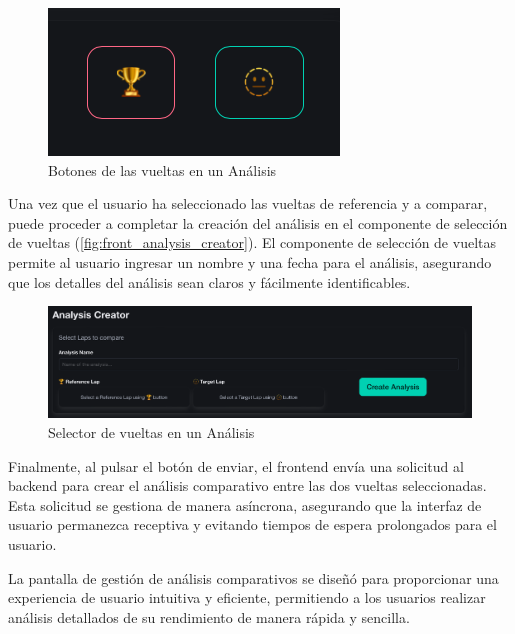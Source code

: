 \begin{figure}[H]
\centering
\includegraphics[width=0.3\linewidth]{./figs/herramientas/desarrollo/front_analysis_btn.png}
\caption[Botones de las vueltas en un Análisis]{Botones de las vueltas en un Análisis}
\label{fig:front_analysis_btn}
\end{figure}

Una vez que el usuario ha seleccionado las vueltas de referencia y a comparar, puede proceder a completar la creación del análisis en el componente de selección de vueltas (\autoref{fig:front_analysis_creator}). El componente de selección de vueltas permite al usuario ingresar un nombre y una fecha para el análisis, asegurando que los detalles del análisis sean claros y fácilmente identificables.

\begin{figure}[H]
\centering
\includegraphics[width=0.6\linewidth]{./figs/herramientas/desarrollo/front_analysis_creator.png}
\caption[Selector de vueltas en un Análisis]{Selector de vueltas en un Análisis}
\label{fig:front_analysis_creator}
\end{figure}

Finalmente, al pulsar el botón de enviar, el frontend envía una solicitud al backend para crear el análisis comparativo entre las dos vueltas seleccionadas. Esta solicitud se gestiona de manera asíncrona, asegurando que la interfaz de usuario permanezca receptiva y evitando tiempos de espera prolongados para el usuario.

La pantalla de gestión de análisis comparativos se diseñó para proporcionar una experiencia de usuario intuitiva y eficiente, permitiendo a los usuarios realizar análisis detallados de su rendimiento de manera rápida y sencilla.

